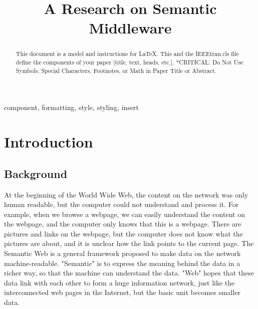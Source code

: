 \documentclass[conference]{IEEEtran}
\begin{document}
\title{A Research on Semantic Middleware\\

}

\author{
}

\maketitle

\begin{abstract}
This document is a model and instructions for \LaTeX.
This and the IEEEtran.cls file define the components of your paper [title, text, heads, etc.]. *CRITICAL: Do Not Use Symbols, Special Characters, Footnotes, 
or Math in Paper Title or Abstract.
\end{abstract}

\begin{IEEEkeywords}
component, formatting, style, styling, insert
\end{IEEEkeywords}

\section{Introduction}
\subsection{Background}

At the beginning of the World Wide Web, the content on the network was only human readable, but the computer could not understand and process it. For example, when we browse a webpage, we can easily understand the content on the webpage, and the computer only knows that this is a webpage. There are pictures and links on the webpage, but the computer does not know what the pictures are about, and it is unclear how the link points to the current page. The Semantic Web is a general framework proposed to make data on the network machine-readable. "Semantic" is to express the meaning behind the data in a richer way, so that the machine can understand the data. "Web" hopes that these data link with each other to form a huge information network, just like the interconnected web pages in the Internet, but the basic unit becomes smaller data.
\end{document}
